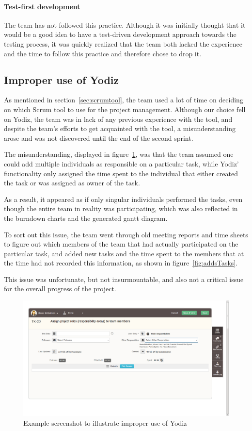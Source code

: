 \paragraph{Test-first development}
The team has not followed this practice. Although it was initially thought that it would be a good idea to have a test-driven development approach towards the testing process, it was quickly realized that the team both lacked the experience and the time to follow this practice and therefore chose to drop it.




\subsection{Improper use of Yodiz}
\label{sec:improperScrum}
As mentioned in section~\ref{sec:scrumtool}, the team used a lot of time on
deciding on which Scrum tool to use for the project management. Although our
choice fell on Yodiz, the team was in lack of any previous experience with the
tool, and despite the team's efforts to get acquainted with the tool, a
misunderstanding arose and was not discovered until the end of the second
sprint.

The misunderstanding, displayed in figure~\ref{fig:wrongUse}, was that the team
assumed one could add multiple individuals as responsible on a particular task,
while Yodiz' functionality only assigned the time spent to the individual that
either created the task or was assigned as owner of the task.

As a result, it appeared as if only singular individuals performed the tasks,
even though the entire team in reality was participating, which was also
reflected in the burndown charts and the generated gantt diagram. 

To sort out this issue, the team went through old meeting reports and time sheets
to figure out which members of the team that had actually participated on the
particular task, and added new tasks and the time spent to the members that at
the time had not recorded this information, as shown in
figure~\ref{fig:addsTasks}.

This issue was unfortunate, but not insurmountable, and also not a critical
issue for the overall progress of the project.

\begin{figure}[H]
\includegraphics[width=\textwidth]{ch/devProcess/fig/wrongUse.png}
\caption{Example screenshot to illustrate improper use of Yodiz}
\label{fig:wrongUse}
\end{figure}

